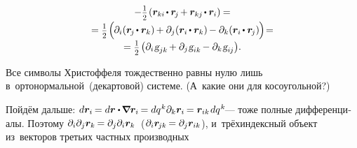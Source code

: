 \begin{otherlanguage}{russian}
\begin{multline}
- \smalldisplaystyleonehalf \hspace{-0.2ex} \left( \scalebox{0.96}[1]{$\bm{r}_{ki} \hspace{-0.2ex} \dotp \bm{r}_{\hspace{-0.2ex}j} \hspace{-0.16ex} + \bm{r}_{kj} \hspace{-0.2ex} \dotp \bm{r}_i$} \right) \hspace{-0.1ex} = \\[-0.25em]
%
= \smalldisplaystyleonehalf \hspace{-0.2ex} \left(^{\mathstrut} \hspace{-0.2ex}
\partial_i ( \bm{r}_{\hspace{-0.2ex}j} \hspace{-0.2ex} \dotp \bm{r}_k ) \hspace{-0.16ex}
+ \partial_j ( \bm{r}_{i} \hspace{-0.2ex} \dotp \bm{r}_k ) \hspace{-0.16ex}
- \partial_k ( \bm{r}_{i} \hspace{-0.2ex} \dotp \bm{r}_{\hspace{-0.2ex}j} )
\hspace{-0.12ex} \right) \hspace{-0.4ex} = \\[-0.25em]
%
= \smalldisplaystyleonehalf \hspace{-0.16ex} \left(
\partial_i \hspace{.12ex} \textsl{g}_{jk} \hspace{-0.2ex}
+ \partial_j \hspace{.1ex} \textsl{g}_{ik} \hspace{-0.2ex}
- \partial_k \hspace{.12ex} \textsl{g}_{i\hspace{-0.1ex}j}
\right) \hspace{-0.4ex} .
\end{multline}

Все символы Христоффеля тождественно равны нулю лишь в~ортонормальной~(декартовой) системе. (А~какие они для косоугольной?)

Пойдём дальше: ${d\bm{r}_i \hspace{-0.2ex} = d\bm{r} \dotp \hspace{-0.2ex} \boldnabla \bm{r}_i \hspace{-0.2ex} = dq^{\hspace{.1ex}k} \partial_k \bm{r}_i \hspace{-0.2ex} = \bm{r}_{ik} \hspace{0.2ex} dq^{\hspace{.1ex}k}\hspace{-0.25ex}}$\:--- тоже полные дифференциалы.
Поэтому ${\partial_i \partial_j \bm{r}_k \hspace{-0.2ex} = \partial_j \partial_i \bm{r}_k}$~(${\partial_i \bm{r}_{\hspace{-0.2ex}jk} \hspace{-0.2ex} = \partial_j \bm{r}_{ik}}$),
и~трёхиндексный объект из~векторов третьих частных производных


\end{otherlanguage}
